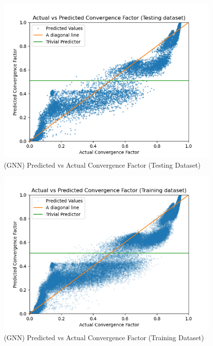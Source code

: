 \begin{figure}[h]
  \centering
  \includegraphics[scale=0.7]{figures/recircflow/gnn_test_pred.png}
  \caption{(GNN) Predicted vs Actual Convergence Factor (Testing Dataset)}
  \label{fig:test}
\end{figure}

\begin{figure}[h]
  \centering
  \includegraphics[scale=0.7]{figures/recircflow/gnn_train_pred.png}
  \caption{(GNN) Predicted vs Actual Convergence Factor (Training Dataset)}
  \label{fig:train}
\end{figure}

